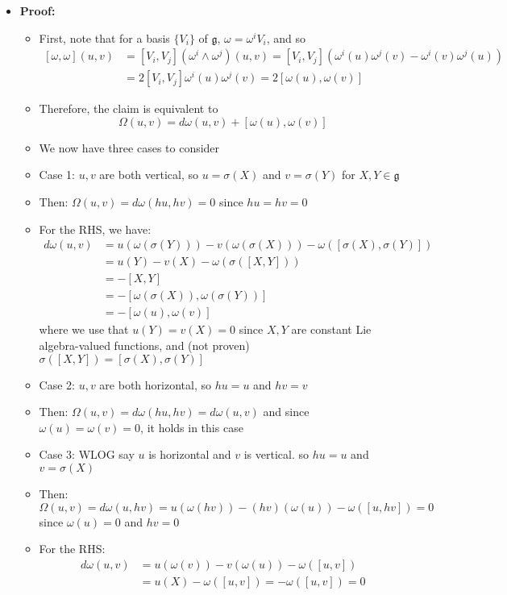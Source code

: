 \documentclass[12pt,a4paper]{article}
\numberwithin{equation}{section}
\begin{document}
\begin{itemize}
		\item \textbf{Proof:}
		\begin{itemize}
			\item First, note that for a basis $\{V_{i}\}$ of $\mathfrak{g}$, $\omega=\omega^{i}V_{i}$, and so
			$$
			\begin{aligned}
			[\omega,\omega](u,v)&=[V_{i},V_{j}](\omega^{i}\wedge\omega^{j})(u,v)=[V_{i},V_{j}](\omega^{i}(u)\omega^{j}(v)-\omega^{i}(v)\omega^{j}(u))\\&=2[V_{i},V_{j}]\omega^{i}(u)\omega^{j}(v)=2[\omega(u),\omega(v)]
			\end{aligned} 
			$$
			\item Therefore, the claim is equivalent to 
			$$
			\Omega(u,v)=d\omega(u,v)+[\omega(u),\omega(v)]
			$$
			\item We now have three cases to consider
			\item Case 1: $u,v$ are both vertical, so $u=\sigma(X)$ and $v=\sigma(Y)$ for $X,Y\in\mathfrak{g}$
			\item Then: $\Omega(u,v)=d\omega(hu,hv)=0$ since $hu=hv=0$
			\item For the RHS, we have:
			$$
			\begin{aligned}
				d\omega(u,v)&=u(\omega(\sigma(Y)))-v(\omega(\sigma(X)))-\omega([\sigma(X),\sigma(Y)])\\&=u(Y)-v(X)-\omega(\sigma([X,Y]))\\&=-[X,Y]\\&=-[\omega(\sigma(X)),\omega(\sigma(Y))]\\&=-[\omega(u),\omega(v)]
			\end{aligned}
			$$
			where we use that $u(Y)=v(X)=0$ since $X,Y$ are constant Lie algebra-valued functions, and (not proven) $\sigma([X,Y])=[\sigma(X),\sigma(Y)]$
			\item Case 2: $u,v$ are both horizontal, so $hu=u$ and $hv=v$
			\item Then: $\Omega(u,v)=d\omega(hu,hv)=d\omega(u,v)$ and since $\omega(u)=\omega(v)=0$, it holds in this case
			\item Case 3: WLOG say $u$ is horizontal and $v$ is vertical. so $hu=u$ and $v=\sigma(X)$
			\item Then:
			$$
			\Omega(u,v)=d\omega(u,hv)=u(\omega(hv))-(hv)(\omega(u))-\omega([u,hv])=0
			$$
			since $\omega(u)=0$ and $hv=0$
			\item For the RHS:
			$$
			\begin{aligned}
				d\omega(u,v)&=u(\omega(v))-v(\omega(u))-\omega([u,v])\\&=u(X)-\omega([u,v])=-\omega([u,v])=0

\end{aligned}$$
\end{itemize}
\end{itemize}
\end{document}
